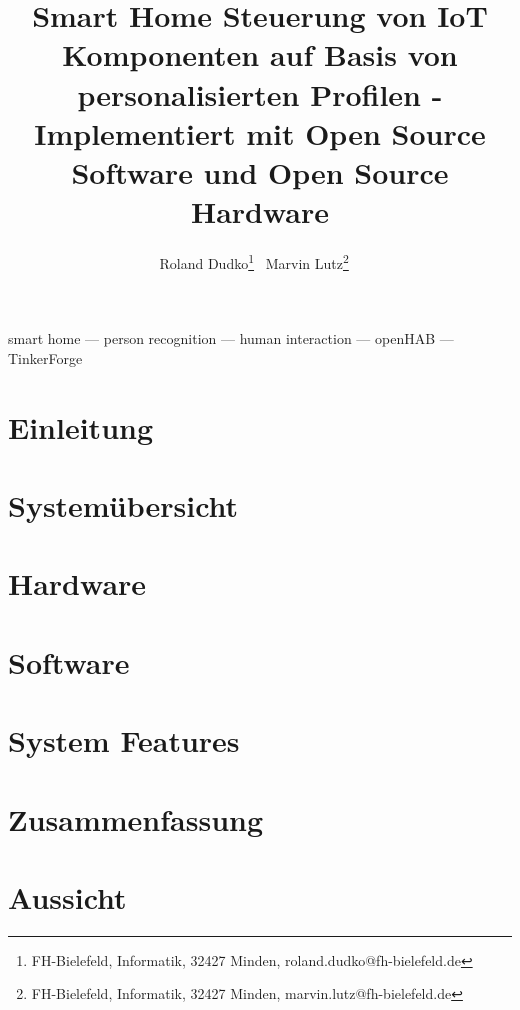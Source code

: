 \documentclass{lni}
\author{Roland Dudko\footnote{FH-Bielefeld, Informatik, 32427 Minden, roland.dudko@fh-bielefeld.de} \,
        Marvin Lutz\footnote{FH-Bielefeld, Informatik, 32427 Minden, marvin.lutz@fh-bielefeld.de} \ }
\title{Smart Home Steuerung von IoT Komponenten auf Basis von personalisierten Profilen - Implementiert mit Open Source Software und Open Source Hardware}
\renewcommand{\headrulewidth}{0.4pt} %
\begin{document}
\maketitle
\renewcommand{\refname}{Literaturverzeichnis}
\setcounter{footnote}{2} %

\begin{abstract}

\end{abstract}
\begin{keywords}
smart home --- person recognition --- human interaction --- openHAB --- TinkerForge
\end{keywords}

\section{Einleitung}


\pagestyle{fancy}
\fancyhead{} %
\fancyfoot{} %
\renewcommand{\headrulewidth}{0.4pt} %

\section{Systemübersicht}

\section{Hardware}

\section{Software}

\section{System Features}

\section{Zusammenfassung}

\section{Aussicht}




\end{document}
